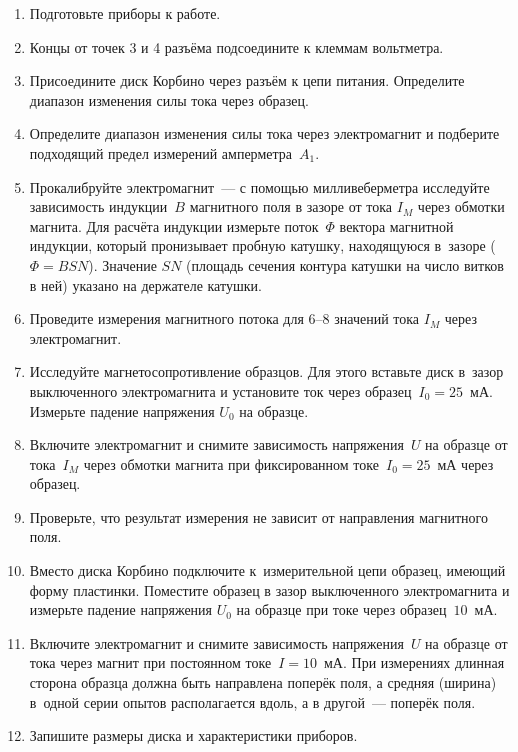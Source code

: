 \begin{enumerate}

\item{ Подготовьте приборы к работе.}

\item{ Концы от точек 3 и 4 разъёма подсоедините к клеммам вольтметра.}

\item{ Присоедините диск Корбино через разъём к цепи питания. Определите диапазон изменения силы тока через образец.}

\item{ Определите диапазон изменения силы тока через электромагнит и подберите подходящий предел измерений амперметра~$A_1$.}

\item{ Прокалибруйте электромагнит~--- с помощью милливеберметра исследуйте зависимость индукции~$B$ магнитного поля в зазоре от тока $I_M$ через обмотки магнита. Для расчёта индукции измерьте поток~$\Phi$ вектора магнитной индукции, который пронизывает пробную катушку, находящуюся в~зазоре ($\Phi=BSN$). Значение $SN$ (площадь сечения контура катушки на число витков в ней) указано на держателе катушки.}

\item{ Проведите измерения магнитного потока для 6--8 значений тока $I_M$ через электромагнит.}

\item{ Исследуйте магнетосопротивление образцов. Для этого вставьте диск в~зазор выключенного электромагнита и установите ток через образец~$I_0=25$~мА. Измерьте падение напряжения $U_0$ на образце.}

\item{ Включите электромагнит и снимите зависимость напряжения~$U$ на образце от тока~$I_M$ через обмотки магнита при фиксированном токе~$I_0=25$~мА через образец.}

\item{ Проверьте, что результат измерения не зависит от направления магнитного поля.}

\item{ Вместо диска Корбино подключите к~измерительной цепи образец, имеющий форму пластинки. Поместите образец в зазор выключенного электромагнита и измерьте падение напряжения $U_0$ на образце при токе через образец~$10$~мА.}

\item{ Включите электромагнит и снимите зависимость напряжения~$U$ на образце от тока через магнит при постоянном токе~$I=10$~мА. При измерениях длинная сторона образца должна быть направлена поперёк поля, а средняя (ширина) в~одной серии опытов располагается вдоль, а в другой~--- поперёк поля.}

\item{ Запишите размеры диска и характеристики приборов.}
\end{enumerate}


